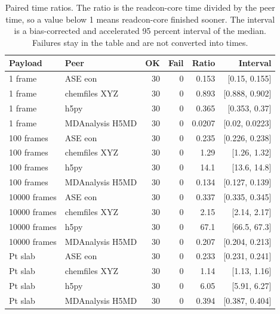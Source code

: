 \begin{table}[ht]
\centering
\small
\caption{Paired time ratios. The ratio is the readcon-core time divided by the peer time, so a value below 1 means readcon-core finished sooner. The interval is a bias-corrected and accelerated 95 percent interval of the median. Failures stay in the table and are not converted into times.}
\label{tab:ratios}
\footnotesize
\setlength{\tabcolsep}{4pt}
\begin{tabular}{llrrrr}
\toprule
Payload & Peer & OK & Fail & Ratio & Interval \\
\midrule
1 frame & ASE eon & 30 & 0 & 0.153 & [0.15, 0.155] \\
1 frame & chemfiles XYZ & 30 & 0 & 0.893 & [0.888, 0.902] \\
1 frame & h5py & 30 & 0 & 0.365 & [0.353, 0.37] \\
1 frame & MDAnalysis H5MD & 30 & 0 & 0.0207 & [0.02, 0.0223] \\
100 frames & ASE eon & 30 & 0 & 0.235 & [0.226, 0.238] \\
100 frames & chemfiles XYZ & 30 & 0 & 1.29 & [1.26, 1.32] \\
100 frames & h5py & 30 & 0 & 14.1 & [13.6, 14.8] \\
100 frames & MDAnalysis H5MD & 30 & 0 & 0.134 & [0.127, 0.139] \\
10000 frames & ASE eon & 30 & 0 & 0.337 & [0.335, 0.345] \\
10000 frames & chemfiles XYZ & 30 & 0 & 2.15 & [2.14, 2.17] \\
10000 frames & h5py & 30 & 0 & 67.1 & [66.5, 67.3] \\
10000 frames & MDAnalysis H5MD & 30 & 0 & 0.207 & [0.204, 0.213] \\
Pt slab & ASE eon & 30 & 0 & 0.233 & [0.231, 0.241] \\
Pt slab & chemfiles XYZ & 30 & 0 & 1.14 & [1.13, 1.16] \\
Pt slab & h5py & 30 & 0 & 6.05 & [5.91, 6.27] \\
Pt slab & MDAnalysis H5MD & 30 & 0 & 0.394 & [0.387, 0.404] \\
\bottomrule
\end{tabular}
\end{table}
